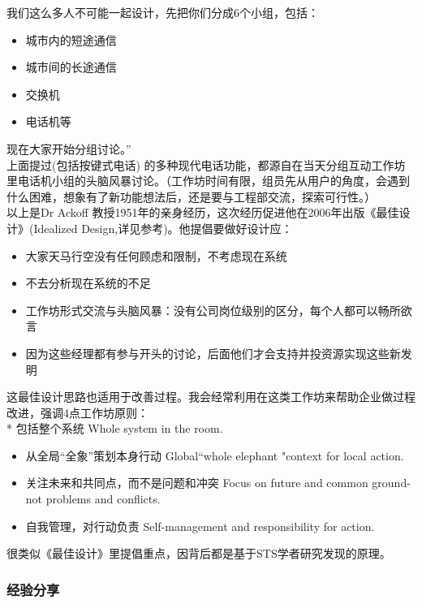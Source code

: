 我们这么多人不可能一起设计，先把你们分成6个小组，包括：

\begin{itemize}
\tightlist
\item
  城市内的短途通信
\item
  城市间的长途通信
\item
  交换机
\item
  电话机等\\
\end{itemize}

现在大家开始分组讨论。''\\
上面提过(包括按键式电话)
的多种现代电话功能，都源自在当天分组互动工作坊里电话机小组的头脑风暴讨论。（工作坊时间有限，组员先从用户的角度，会遇到什么困难，想象有了新功能想法后，还是要与工程部交流，探索可行性。）\\
以上是Dr Ackoff
教授1951年的亲身经历，这次经历促进他在2006年出版《最佳设计》(Idealized
Design,详见参考)。他提倡要做好设计应：

\begin{itemize}
\tightlist
\item
  大家天马行空没有任何顾虑和限制，不考虑现在系统
\item
  不去分析现在系统的不足
\item
  工作坊形式交流与头脑风暴：没有公司岗位级别的区分，每个人都可以畅所欲言
\item
  因为这些经理都有参与开头的讨论，后面他们才会支持并投资源实现这些新发明\\
\end{itemize}

这最佳设计思路也适用于改善过程。我会经常利用在这类工作坊来帮助企业做过程改进，强调4点工作坊原则：\\
* 包括整个系统 Whole system in the room.

\begin{itemize}
\tightlist
\item
  从全局``全象''策划本身行动 Global``whole elephant "context for local
  action.
\item
  关注未来和共同点，而不是问题和冲突 Focus on future and common
  ground-not problems and conflicts.
\item
  自我管理，对行动负责 Self-management and responsibility for action.\\
\end{itemize}

很类似《最佳设计》里提倡重点，因背后都是基于STS学者研究发现的原理。

\hypertarget{ux7ecfux9a8cux5206ux4eab}{%
\subsubsection{经验分享}\label{ux7ecfux9a8cux5206ux4eab}}

